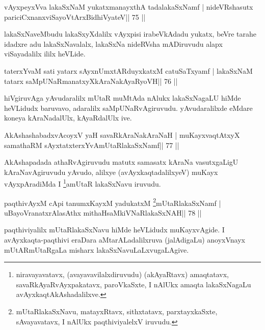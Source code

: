 \begin{shl}
vAyxpeyxVva lakaSxNaM yukatxmanayxthA tadalakaSxNamf |
nideVRshasutx pariciCxnanxviSayoV\s tArxBidhiVyateV\hfill || 75 ||
\end{shl}

\begin{artha}
lakaSxNaveMbudu lakaSxyXdalilx vAyxpisi irabeVkAdadu yukatx, beVre tarahe idadxre adu lakaSxNavalalx, lakaSxNa nideRVsha mADiruvudu alapx viSayadalilx ililx heVLide.
\end{artha}


\begin{shl}
taterxYvaM sati yatarx sAyxnUmxtARduyxkatxM catuSaTxyamf |
lakaSxNaM tatarx saMpUNaRmanatxyXkAraNakAyaRyoVH\hfill || 76 ||
\end{shl}

\begin{artha}
hiVgiruvAga yAvudaralilx mUtaR muMtAda nAlukx lakaSxNagaLU hiMde
heVLidudx baruvavo, adaralilx saMpUNaRvAgiruvudu. yAvudaralilxde
eMdare koneya kAraNadalUlx, kAyaRdalUlx ive. 
\end{artha}


\begin{shl}
AkAshashabadxvAcoyxV yaH savaRkAraNakAraNaH |
muKayxvaqtAtxyX samathaRM sAyxtatxterxYvAmUtaRlakaSxNamf\hfill || 77 ||
\end{shl}

\begin{artha}
AkAshapadada athaRvAgiruvudu matutx samasatx kAraNa vasutxgaLigU kAraNavAgiruvudu yAvudo, alilxye (avAyxkaqtadalilxyeV) muKayx vAyxpAradiMda I \footnote{niravayavatavx, (avayavavilalxdiruvudu)   (akAyaRtavx) amaqtatavx, savaRkAyaRvAyxpakatavx, paroVkaSxte, I   nAlUkx amaqta lakaSxNagaLu avAyxkaqtAkAshadalilxve.}amUtaR lakaSxNavu iruvudu.
\end{artha}




\begin{shl}
paqthivAyxM cApi tanumxKayxM yadukatxM \footnote{mUtaRlakaSxNavu, matayxRtavx, sithxtatavx, parxtayxkaSxte, sAvayavatavx, I nAlUkx paqthiviyalelxV iruvudu.}mUtaRlakaSxNamf |
uBayoVranatxrAlasAthx mithaHsaMkiVNaRlakaSxNAH\hfill || 78 ||
\end{shl}

\begin{artha}
paqthiviyalilx mUtaRlakaSxNavu hiMde heVLidudx muKayxvAgide. I avAyxkaqta-paqthivi eraDara aMtarALadalilxruva (jalAdigaLu) anoyxVnayx mUtARmUtaRgaLa misharx lakaSxNavuLaLxvugaLAgive.
\end{artha}

